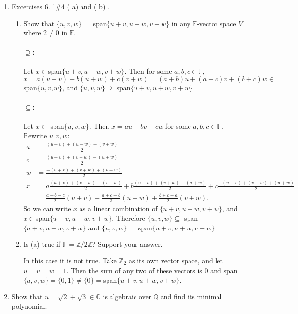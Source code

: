 \documentclass{article}
\begin{document}
\begin{enumerate} 

    \item Excercises 6. 1$\#$4 ( a)  and ( b) .
        \begin{enumerate}
            \item  Show that $\{u,v,w\}=$ span$\{u+v,u+w,v+w\}$ in any $\mathbb{F}$-vector space $V$ where 2$\neq0$ in $\mathbb{F}.$

                \paragraph{$\supseteq $: }Let $x\in $span$ \{u+v,u+w,v+w\} $. Then for some $a,b,c\in \mathbb{F},$
                $x=a(u+v)+b(u+w)+c(v+w)=(a+b)u+(a+c)v+(b+c)w\in $span$\{u,v,w\} $, and 
                $\{u,v,w\}\supseteq $ span$\{u+v,u+w,v+w\}$

                \paragraph{$\subseteq $:} Let $x\in$ span$\{u,v,w\} $. Then $x=au+bv+cw$ for some $a,b,c\in \mathbb{F}$. Rewrite $u,v,w:$
                 \begin{align*}
                    u&= \frac{(u+v)+(u+w)-(v+w)}{2} \\
                    v&= \frac{(u+v)+(v+w)-(u+w)}{2} \\
                    w&= \frac{-(u+v)+(v+w)+(u+w)}{2}\\
                    x&=a\frac{(u+v)+(u+w)-(v+w)}{2} +b\frac{(u+v)+(v+w)-(u+w)}{2}+c\frac{-(u+v)+(v+w)+(u+w)}{2}\\
                    &= \frac{a+b-c}{2}(u+v)+\frac{a+c-b}{2}(u+w)+\frac{b+c-a}{2}(v+w) 
                .\end{align*}
                So we can write $x$ as a linear combination of $\{u+v,u+w,v+w\}$, and $x\in $span$ \{u+v,u+w,v+w\}$. Therefore
                $\{u,v,w\}\subseteq $ span$\{u+v,u+w,v+w\}$ and $\{u,v,w\}=$ span$\{u+v,u+w,v+w\}$

            \item  Is (a) true if $\mathbb{F}=\mathbb{Z}/2\mathbb{Z}$? Support your answer.

                In this case it is not true. Take $\mathbb{Z}_2$ as its own vector space, and let $u=v=w=1$. Then the sum of any two of these vectors
                is  $0$ and span $\{u,v,w\} =\{0,1\} \neq \{0\} =$span$ \{u+v,u+w,v+w\} $.
        \end{enumerate}
    \item Show that $u=\sqrt{2}+\sqrt{3}\in\mathbb{C}$ is algebraic over $\mathbb{Q}$ and find its
minimal polynomial.


\end{enumerate}
\end{document}

